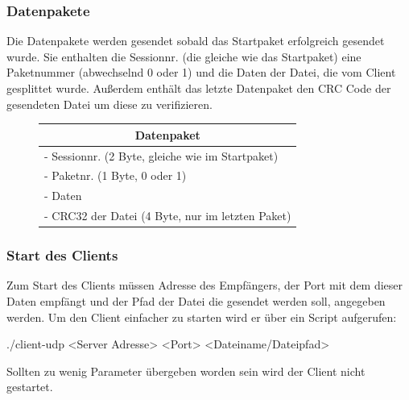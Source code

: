 \documentclass[a4paper, 12pt]{scrartcl}
\begin{document}
\subsubsection{Datenpakete} \label{Datenpakete}
Die Datenpakete werden gesendet sobald das Startpaket erfolgreich gesendet wurde. Sie enthalten die Sessionnr. (die gleiche wie das Startpaket) eine Paketnummer (abwechselnd 0 oder 1) und die Daten der Datei, die vom Client gesplittet wurde. Außerdem enthält das letzte Datenpaket den CRC Code der gesendeten Datei um diese zu verifizieren.
\begin{figure}[h]
	\centering
		\begin{tabular}{|l|}
		\hline		
		\multicolumn{1}{|c|}{Datenpaket}\\
		\hline \hline
		- Sessionnr. (2 Byte, gleiche wie im Startpaket)\\
		- Paketnr.   (1 Byte, 0 oder 1)\\
		- Daten\\
		- CRC32 der Datei (4 Byte, nur im letzten Paket)\\
		\hline
		\end{tabular}
\end{figure}
\subsubsection{Start des Clients}
Zum Start des Clients müssen Adresse des Empfängers, der Port mit dem dieser Daten empfängt und der Pfad der Datei die gesendet werden soll, angegeben werden. Um den Client einfacher zu starten wird er über ein Script aufgerufen:
\begin{center}
./client-udp <Server Adresse> <Port> <Dateiname/Dateipfad>
\end{center}   
Sollten zu wenig Parameter übergeben worden sein wird der Client nicht gestartet.
\end{document}
